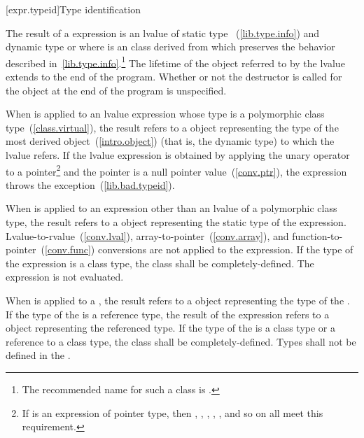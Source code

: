 [expr.typeid]{Type identification}

\pnum
{}%
%
The result of a  expression is an lvalue of static type
%
%
 ~(\ref{lib.type.info}) and dynamic type 
 or   where  is an
 class derived from
 which preserves the behavior described
in~\ref{lib.type.info}.\footnote{The recommended name for such a class is
.}
The lifetime of the object referred to by the lvalue extends to the end
of the program. Whether or not the destructor is called for the
 object at the end of the program is unspecified.

\pnum
When  is applied to an lvalue expression whose type is a
polymorphic class type~(\ref{class.virtual}), the result refers to a
 object representing the type of the most derived
object~(\ref{intro.object}) (that is, the dynamic type) to which the
lvalue refers. If the lvalue expression is obtained by applying the
unary \tcode{*} operator to a pointer\footnote{If  is an expression of
pointer type, then ,
, , , , and so on
all meet this requirement.}
and the pointer is a null pointer value~(\ref{conv.ptr}), the
 expression throws the
%
%
 exception~(\ref{lib.bad.typeid}).

\pnum
When  is applied to an expression other than an lvalue of
a polymorphic class type, the result refers to a 
object representing the static type of the expression.
Lvalue-to-rvalue~(\ref{conv.lval}), array-to-pointer~(\ref{conv.array}),
and function-to-pointer~(\ref{conv.func}) conversions are not applied to
the expression.
%
If the type of the expression is a class type, the class shall be
completely-defined. The expression is not evaluated.

\pnum
When  is applied to a , the result
refers to a  object representing the type of the
. If the type of the  is a reference
type, the result of the
 expression refers to a  object
representing the referenced type. If the type of
the  is a class type or a reference to a class type,
the class shall be completely-defined. Types shall not be defined in the
.

